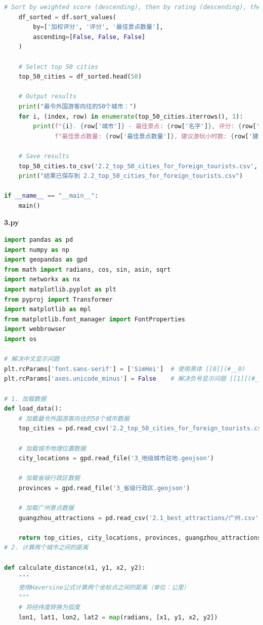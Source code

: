 \documentclass[withoutpreface,bwprint]{cumcmthesis} %
\begin{document}
\begin{appendices}
\begin{lstlisting}[language=python]
    # Sort by weighted score (descending), then by rating (descending), then by count (descending)
    df_sorted = df.sort_values(
        by=['加权评分', '评分', '最佳景点数量'], 
        ascending=[False, False, False]
    )
    
    # Select top 50 cities
    top_50_cities = df_sorted.head(50)
    
    # Output results
    print("最令外国游客向往的50个城市：")
    for i, (index, row) in enumerate(top_50_cities.iterrows(), 1):
        print(f"{i}. {row['城市']} - 最佳景点: {row['名字']}, 评分: {row['评分']:.1f}, "
              f"最佳景点数量: {row['最佳景点数量']}, 建议游玩小时数: {row['建议游玩小时数']:.1f}")
    
    # Save results
    top_50_cities.to_csv('2.2_top_50_cities_for_foreign_tourists.csv', index=False)
    print("结果已保存到 2.2_top_50_cities_for_foreign_tourists.csv")

if __name__ == "__main__":
    main()
 \end{lstlisting}





 \textbf{3.py}
\begin{lstlisting}[language=python]
import pandas as pd
import numpy as np
import geopandas as gpd
from math import radians, cos, sin, asin, sqrt
import networkx as nx
import matplotlib.pyplot as plt
from pyproj import Transformer
import matplotlib as mpl
from matplotlib.font_manager import FontProperties
import webbrowser
import os

# 解决中文显示问题
plt.rcParams['font.sans-serif'] = ['SimHei']  # 使用黑体 [[0]](#__0)
plt.rcParams['axes.unicode_minus'] = False    # 解决负号显示问题 [[1]](#__1)

# 1. 加载数据
def load_data():
    # 加载最令外国游客向往的50个城市数据
    top_cities = pd.read_csv('2.2_top_50_cities_for_foreign_tourists.csv')
    
    # 加载城市地理位置数据
    city_locations = gpd.read_file('3_地级城市驻地.geojson')
    
    # 加载省级行政区数据
    provinces = gpd.read_file('3_省级行政区.geojson')
    
    # 加载广州景点数据
    guangzhou_attractions = pd.read_csv('2.1_best_attractions/广州.csv')
    
    return top_cities, city_locations, provinces, guangzhou_attractions
# 2. 计算两个城市之间的距离

def calculate_distance(x1, y1, x2, y2):
    """
    使用Haversine公式计算两个坐标点之间的距离（单位：公里）
    """
    # 将经纬度转换为弧度
    lon1, lat1, lon2, lat2 = map(radians, [x1, y1, x2, y2])
    

\end{lstlisting}
\end{appendices}
\end{document}
